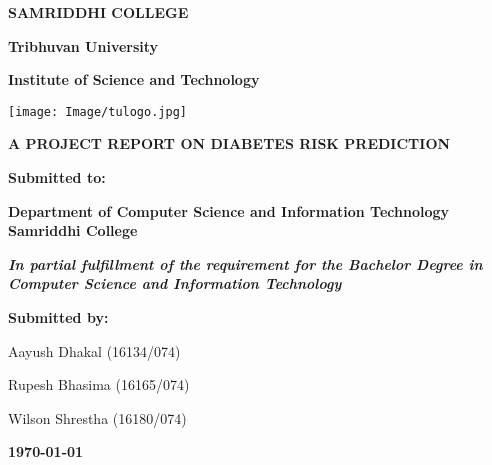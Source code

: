 \begin{titlepage}
\begin{center}

\textbf{\large SAMRIDDHI COLLEGE} \par
\textbf{\large Tribhuvan University} \par
\textbf{\large Institute of Science and Technology} \par

\vspace{1cm}
\texttt{[image: Image/tulogo.jpg]}

\vspace{1cm}
\textbf{\Large A PROJECT REPORT ON DIABETES RISK PREDICTION
}

\vspace{1cm}
\textbf{\large Submitted to:
}

\textbf{\large Department of Computer Science and Information Technology Samriddhi College
}

\vspace{1cm}
\textbf{\small \textit{In partial fulfillment of the requirement for the Bachelor Degree in Computer Science and Information Technology}
}

\vspace{1cm}
\textbf{\large Submitted by:
}


\small Aayush Dhakal (16134/074) \par
\small Rupesh Bhasima (16165/074)  \par
\small Wilson Shrestha (16180/074) \par


\vspace{2.5cm}
\textbf{\large \today}


\end{center}
\end{titlepage}
